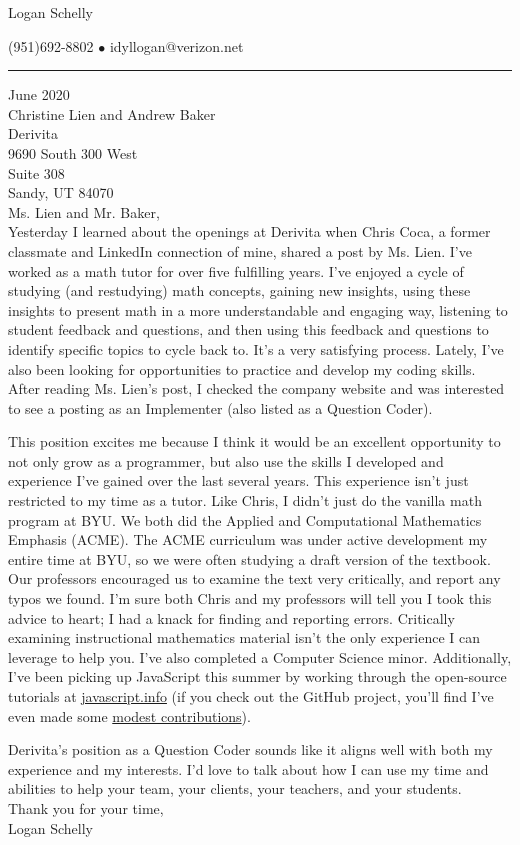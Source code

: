 \documentclass{article}
\begin{document}
\begin{center}
{\Large Logan Schelly}

(951)\phantom{-}692-8802
$\bullet$
idyllogan@verizon.net
\end{center}

\hrule
{} June 2020
\bigskip\\
Christine Lien and Andrew Baker\\
Derivita\\
9690 South 300 West\\
Suite 308\\
Sandy, UT 84070
\bigskip\\
Ms. Lien and Mr. Baker,
\medskip\\
Yesterday I learned about the openings at Derivita when Chris Coca, a former classmate and LinkedIn connection of mine,
shared a post by Ms. Lien.
I've worked as a math tutor for over five fulfilling years.
I've enjoyed a cycle of studying (and restudying) math concepts,
gaining new insights,
using these insights to present math in a more understandable and engaging way,
listening to student feedback and questions,
and then using this feedback and questions to identify specific topics to cycle back to.
It's a very satisfying process.
Lately, I've also been looking for opportunities to practice and develop my coding skills.
After reading Ms. Lien's post, I checked the company website and was interested to see a posting as an Implementer (also listed as a Question Coder).

This position excites me because I think it would be an excellent opportunity to not only grow as a programmer,
but also use the skills I developed and experience I've gained over the last several years.
This experience isn't just restricted to my time as a tutor.
Like Chris, I didn't just do the vanilla math program at BYU.
We both did the Applied and Computational Mathematics Emphasis (ACME).
The ACME curriculum was under active development my entire time at BYU,
so we were often studying a draft version of the textbook.
Our professors encouraged us to examine the text very critically,
and report any typos we found.
I'm sure both Chris and my professors will tell you I took this advice to heart;
I had a knack for finding and reporting errors.
Critically examining instructional mathematics material isn't the only experience
I can leverage to help you.
I've also completed a Computer Science minor.
Additionally, I've been picking up JavaScript this summer by working through the open-source tutorials at
\href{https://javascript.info}{javascript.info} 
(if you check out the GitHub project, you'll find I've even made some \href{https://github.com/javascript-tutorial/en.javascript.info/graphs/contributors?from=2014-10-26&to=2020-08-01&type=a}{modest contributions}).

Derivita's position as a Question Coder sounds like it aligns well with both my experience and my interests.
I'd love to talk about how I can use my time and abilities to help your team, your clients, your teachers, and your students.
\bigskip\\
Thank you for your time,\\
Logan Schelly
\end{document}
